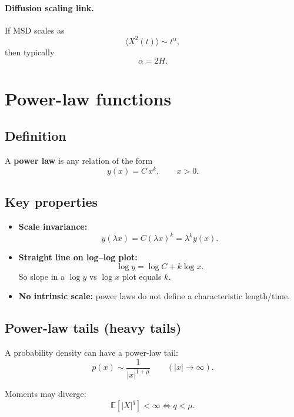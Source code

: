 \paragraph{Diffusion scaling link.}
If MSD scales as
\[
\langle X^2(t)\rangle\sim t^\alpha,
\]
then typically
\begin{equation}
\alpha = 2H.
\end{equation}


\section{Power-law functions}

\subsection{Definition}
A \textbf{power law} is any relation of the form
\begin{equation}
y(x)=C\,x^{k},
\qquad x>0.
\end{equation}

\subsection{Key properties}
\begin{itemize}
\item \textbf{Scale invariance:}
\[
y(\lambda x)=C(\lambda x)^k=\lambda^k y(x).
\]
\item \textbf{Straight line on log--log plot:}
\begin{equation}
\log y = \log C + k\log x.
\end{equation}
So slope in a $\log y$ vs $\log x$ plot equals $k$.
\item \textbf{No intrinsic scale:} power laws do not define a characteristic length/time.
\end{itemize}

\subsection{Power-law tails (heavy tails)}
A probability density can have a power-law tail:
\begin{equation}
p(x)\sim \frac{1}{|x|^{1+\mu}}
\qquad (|x|\to\infty).
\end{equation}

Moments may diverge:
\begin{equation}
\mathbb{E}[|X|^q] < \infty \iff q<\mu.
\end{equation}

